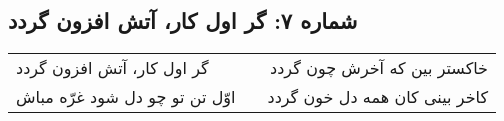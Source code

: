 \begin{center}
\section*{شماره ۷: گر اول کار، آتش افزون گردد}
\label{sec:007}
\begin{longtable}{l p{0.5cm} r}
گر اول کار، آتش افزون گردد
&&
خاکستر بین که آخرش چون گردد
\\
اوّل تن تو چو دل شود غرّه مباش
&&
کاخر بینی کان همه دل خون گردد
\\
\end{longtable}
\end{center}
